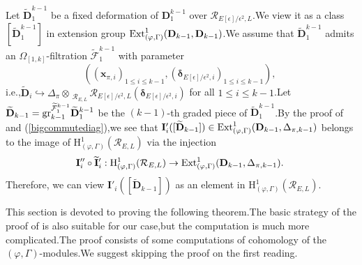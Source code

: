 \documentclass[SecEq,CM,GP]{degruyter-crelle} %
\theoremstyle{plain}
\newcommand{\Dpik}{{\mathbf{D}}}
\newcommand{\ext}{{\rm Ext}}
\newcommand{\gr}{{\rm gr}}
\newcommand{\hH}{{\mathrm{H}}}
\newcommand{\omepik}{\Omega_{[1,k]}}
\newcommand{\bx}{{\mathbf{x}}}
\newcommand{\cR}{\mathcal R}
\newcommand{\cF}{\mathcal F}
\begin{document}
Let $\widetilde{\Dpik}_1^{k-1}$ be a fixed deformation of ${\Dpik}_1^{k-1}$ over $\cR_{E[\epsilon]/\epsilon^2,L}$.\;We view it as a class $[\widetilde{\Dpik}_1^{k-1}]$ in extension group $\ext^1_{(\varphi,\Gamma)}(\Dpik_{k-1},\Dpik_{k-1})$.\;We assume that $\widetilde{\Dpik}_1^{k-1}$ admits an $\omepik$-filtration $\widetilde{\cF}_1^{k-1}$ with parameter $$((\bx_{\pi,i})_{1\leq i\leq k-1},(\bm{\delta}_{E[\epsilon]/\epsilon^2,i})_{1\leq i\leq k-1}),\;$$
i.e.,\;$\widetilde\Dpik_{i}\hookrightarrow {\Delta_\pi}\otimes_{\,\;\cR_{E,L}}\cR_{E[\epsilon]/\epsilon^2,L}(\bm{\delta}_{E[\epsilon]/\epsilon^2,i})$ for all $1\leq i\leq k-1$.\;Let $\widetilde{\Dpik}_{k-1}=\gr_{k-1}^{\widetilde{\cF}_1^{k-1}}\widetilde{\Dpik}_1^{k-1}$ be the $(k-1)$-th graded piece of $\widetilde{\Dpik}_1^{k-1}$.\;By the proof of \cite[Proposition]{Ding2021} and (\ref{bigcommutediag}),\;we see that $\mathbf{I}'_{i}([\widetilde{\Dpik}_{k-1}])\in \ext^1_{(\varphi,\Gamma)}(\Dpik_{k-1},\Delta_{\pi,k-1})$ belongs to the image of $\hH^1_{(\varphi,\Gamma)}(\cR_{E,L})$ via the injection \[ {\mathbf{I}}''_{i}\circ  \widetilde{\mathbf{I}}'_{i}: \hH^1_{(\varphi,\Gamma)}(\cR_{E,L}) \rightarrow  \ext^1_{(\varphi,\Gamma)}(\Dpik_{k-1},\Delta_{\pi,k-1}).\;\]Therefore, we can view $\mathbf{I}'_{i}([\widetilde{\Dpik}_{k-1}])$ as an element in $\hH^1_{(\varphi,\Gamma)}(\cR_{E,L})$.\;

This section is devoted to proving the following theorem.\;The basic strategy of the proof of \cite[Theorem 2.7]{HigherLinvariantsGL3Qp} is also suitable for our case,\;but the computation is much more complicated.\;The proof consists of some computations of cohomology of the $(\varphi,\Gamma)$-modules.\;We suggest skipping the proof on the first reading.\;
\end{document}
